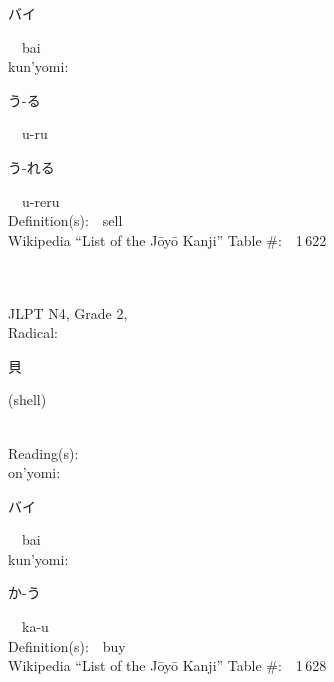 \begin{multicols}{2}
{\hspace*{2em}}{\begin{CJK}{UTF8}{min} バイ \end{CJK}}\ \ bai\ \ \\
{\hspace*{1em}}kun'yomi:\ \ \\
{\hspace*{2em}}{\begin{CJK}{UTF8}{min} う-る \end{CJK}}\ \ u-ru\ \ \\
{\hspace*{2em}}{\begin{CJK}{UTF8}{min} う-れる \end{CJK}}\ \ u-reru\ \ \\
Definition(s):\ \ sell \\
Wikipedia ``List of the J\=oy\=o Kanji'' Table \#:\ \ 1\,622 \\
\ \ \\
{\fontsize{34pt}{40pt}  }\ \ \\  %
{JLPT N4, Grade 2, \\Radical:\ \ {\begin{CJK}{UTF8}{min} 貝 \end{CJK}} (shell) } \\
Reading(s):\ \ \\
{\hspace*{1em}}on'yomi:\ \ \\
{\hspace*{2em}}{\begin{CJK}{UTF8}{min} バイ \end{CJK}}\ \ bai\ \ \\
{\hspace*{1em}}kun'yomi:\ \ \\
{\hspace*{2em}}{\begin{CJK}{UTF8}{min} か-う \end{CJK}}\ \ ka-u\ \ \\
Definition(s):\ \ buy \\
Wikipedia ``List of the J\=oy\=o Kanji'' Table \#:\ \ 1\,628 \\
\ \ \\
{\fontsize{34pt}{40pt}  }\ \ \\  %

\end{multicols}
